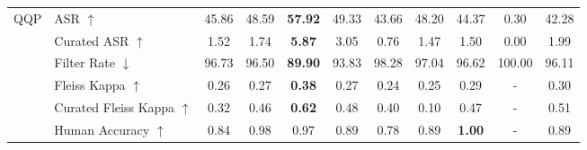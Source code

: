 \documentclass{article}
\begin{document}
\begin{table}[t]
{{\begin{tabular}{ll|cccccccc|c}
           \midrule
           \multirow{6}{*}{QQP} & ASR $\uparrow$ & 45.86 & 48.59 & \textbf{57.92} & 49.33 & 43.66 & 48.20 & 44.37 & 0.30 & 42.28 \\
           & Curated ASR $\uparrow$ & 1.52 & 1.74 & \textbf{5.87} & 3.05 & 0.76 & 1.47 & 1.50 & 0.00 & 1.99 \\
           & Filter Rate $\downarrow$ & 96.73 & 96.50 & \textbf{89.90} & 93.83 & 98.28 & 97.04 & 96.62 & 100.00 & 96.11 \\
           & Fleiss Kappa $\uparrow$  & 0.26 & 0.27 & \textbf{0.38} & 0.27 & 0.24 & 0.25 & 0.29 & - & 0.30 \\
           & Curated Fleiss Kappa $\uparrow$  & 0.32 & 0.46 & \textbf{0.62} & 0.48 & 0.40 & 0.10 & 0.47 & - & 0.51 \\
           & Human Accuracy $\uparrow$ & 0.84 & 0.98 & 0.97 & 0.89 & 0.78 & 0.89 & \textbf{1.00} & - & 0.89 \\
           \bottomrule
    \end{tabular}
    \vspace{-3mm}
  }
}
\end{table}
\end{document}
